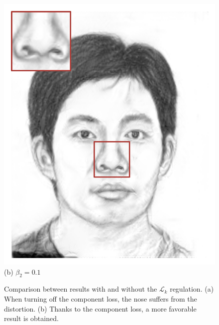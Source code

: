 \documentclass[10pt,twocolumn,letterpaper]{article}
\begin{document}
\begin{figure}[htbp]
\begin{minipage}[t]{0.49\linewidth}
\includegraphics[width=0.99\linewidth]{img/effective_eval/w_region.pdf}
\centering
(b) $\beta_2=0.1$
\end{minipage}
\caption{Comparison between results with and without the $\mathcal{L}_{k} $ regulation. (a) When turning off the component loss, the nose suffers from the distortion. (b) Thanks to the component loss, a more favorable result is obtained.}
\label{fig:region_effect}
\end{figure}
\end{document}
